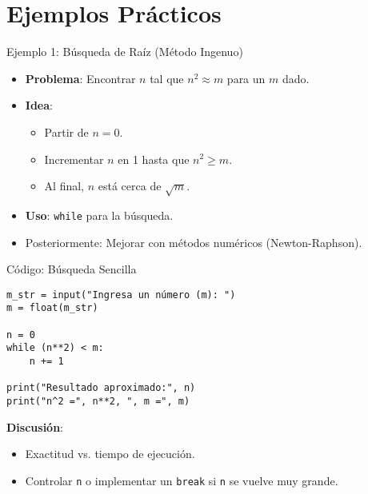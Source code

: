 \documentclass[10pt]{beamer}
\begin{document}
\section{Ejemplos Prácticos}

\begin{frame}{Ejemplo 1: Búsqueda de Raíz (Método Ingenuo)}
  \begin{itemize}
    \item \textbf{Problema}: Encontrar \(n\) tal que \(n^2 \approx m\) para un \(m\) dado.
    \item \textbf{Idea}:
      \begin{itemize}
        \item Partir de \(n=0\).
        \item Incrementar \(n\) en 1 hasta que \(n^2 \ge m\).
        \item Al final, \(n\) está cerca de \(\sqrt{m}\).
      \end{itemize}
    \item \textbf{Uso}: \texttt{while} para la búsqueda.
    \item Posteriormente: Mejorar con métodos numéricos (Newton-Raphson).
  \end{itemize}
\end{frame}

\begin{frame}[fragile]{Código: Búsqueda Sencilla}
\begin{verbatim}
m_str = input("Ingresa un número (m): ")
m = float(m_str)

n = 0
while (n**2) < m:
    n += 1

print("Resultado aproximado:", n)
print("n^2 =", n**2, ", m =", m)
\end{verbatim}
\textbf{Discusión}:
\begin{itemize}
  \item Exactitud vs. tiempo de ejecución.
  \item Controlar \texttt{n} o implementar un \texttt{break} si \texttt{n} se vuelve muy grande.
\end{itemize}
\end{frame}
\end{document}
